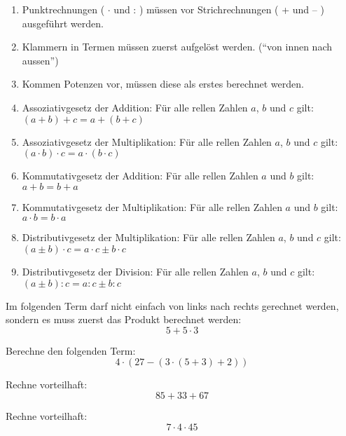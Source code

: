 \begin{tcolorbox}[colback=red!10!white,colframe=red!70!black,title=Rechengesetze,width=.9\linewidth]
	\begin{enumerate}
		\item
			Punktrechnungen ( $\cdot$ und : ) müssen vor Strichrechnungen ( + und -- ) ausgeführt werden.
		\item
			Klammern in Termen müssen zuerst aufgelöst werden. ("`von innen nach aussen"')
		\item
			Kommen Potenzen vor, müssen diese als erstes berechnet werden.
		\item
			Assoziativgesetz der Addition: Für alle rellen Zahlen $a$, $b$ und $c$ gilt: $(a+b)+c = a+(b+c)$
		\item
			Assoziativgesetz der Multiplikation: Für alle rellen Zahlen $a$, $b$ und $c$ gilt: $(a\cdot b)\cdot c = a\cdot (b\cdot c)$
		\item
			Kommutativgesetz der Addition: Für alle rellen Zahlen $a$ und $b$ gilt: $a+ b= b+ a$
		\item
			Kommutativgesetz der Multiplikation: Für alle rellen Zahlen $a$ und $b$ gilt: $a\cdot b= b\cdot a$
		\item
			Distributivgesetz der Multiplikation: Für alle rellen Zahlen $a$, $b$ und $c$ gilt: $(a\pm b)\cdot c = a\cdot c \pm b\cdot c$
		\item
			Distributivgesetz der Division: Für alle rellen Zahlen $a$, $b$ und $c$ gilt: $(a\pm b): c = a: c \pm b: c$	
	\end{enumerate}
		
\end{tcolorbox}

\begin{example}
Im folgenden Term darf nicht einfach von links nach rechts gerechnet werden, sondern es muss zuerst das Produkt berechnet werden:
\[
	5+5\cdot 3
\]
\end{example}

\begin{example}
Berechne den folgenden Term:
\[
	4\cdot(27-(3\cdot (5+3)+2))
\]
\end{example}

\begin{example}
Rechne vorteilhaft:
\[
	85+33+67
\]
\end{example}

\begin{example}
Rechne vorteilhaft:
\[
	7\cdot 4 \cdot 45
\]
\end{example}

